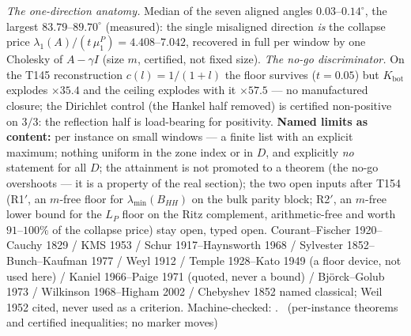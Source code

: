 \emph{The one-direction anatomy.} Median of the seven aligned angles
$0.03$--$0.14^\circ$, the largest $83.79$--$89.70^\circ$ (measured): the
single misaligned direction \emph{is} the collapse price
$\lambda_1(A)/(t\,\mu^P_1)=4.408$--$7.042$, recovered in full per window
by one Cholesky of $A-\gamma I$ (size $m$, certified, not fixed size).
\emph{The no-go discriminator.} On the T145 reconstruction
$c(l)=1/(1+l)$ the floor survives ($t=0.05$) but $K_{\mathrm{bot}}$
explodes $\times35.4$ and the ceiling explodes with it $\times57.5$ ---
no manufactured closure; the Dirichlet control (the Hankel half removed)
is certified non-positive on $3/3$: the reflection half is load-bearing
for positivity.
\textbf{Named limits as content:} per instance on small windows --- a
finite list with an explicit maximum; nothing uniform in the zone index
or in $D$, and explicitly \emph{no} statement for all $D$; the attainment
is not promoted to a theorem (the no-go overshoots --- it is a property
of the real section); the two open inputs after T154 (R1$'$, an $m$-free
floor for $\lambda_{\min}(B_{HH})$ on the bulk parity block; R2$'$, an
$m$-free lower bound for the $L_P$ floor on the Ritz complement,
arithmetic-free and worth $91$--$100\%$ of the collapse price) stay open,
typed open.
Courant--Fischer 1920--Cauchy 1829 / KMS 1953 / Schur 1917--Haynsworth
1968 / Sylvester 1852--Bunch--Kaufman 1977 / Weyl 1912 / Temple
1928--Kato 1949 (a floor device, not used here) / Kaniel 1966--Paige 1971
(quoted, never a bound) / Bj\"orck--Golub 1973 / Wilkinson 1968--Higham
2002 / Chebyshev 1852 named classical; Weil 1952 cited, never used as a
criterion.
Machine-checked:
.
\mE\ (per-instance theorems and certified inequalities; no marker moves)


